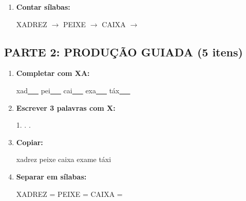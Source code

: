 \begin{exercicio}
\begin{enumerate}
  \item \textbf{Contar sílabas:}
  \begin{center}
  XADREZ $\rightarrow$ \underline{\hspace{0.9cm}} \quad PEIXE $\rightarrow$ \underline{\hspace{0.9cm}} \quad CAIXA $\rightarrow$ \underline{\hspace{0.9cm}}
  \end{center}

\end{enumerate}

\subsection*{PARTE 2: PRODUÇÃO GUIADA (5 itens)}

\begin{enumerate}[resume]

  \item \textbf{Completar com XA:}
  \begin{center}
  xad\underline{~~~} \quad pei\underline{~~~} \quad cai\underline{~~~} \quad exa\underline{~~~} \quad táx\underline{~~~}
  \end{center}

  \item \textbf{Escrever 3 palavras com X:}
  \begin{center}
  1. \underline{\hspace{3cm}} . \underline{\hspace{3cm}} . \underline{\hspace{3cm}}
  \end{center}

  \item \textbf{Copiar:}
  \begin{center}
  xadrez \quad peixe \quad caixa \quad exame \quad táxi
  \end{center}

  \item \textbf{Separar em sílabas:}
  \begin{center}
  XADREZ = \underline{\hspace{1cm}} \underline{\hspace{1cm}} \quad PEIXE = \underline{\hspace{1cm}} \underline{\hspace{1cm}} \quad CAIXA = \underline{\hspace{1cm}} \underline{\hspace{1cm}}
  \end{center}


\end{enumerate}
\end{exercicio}
